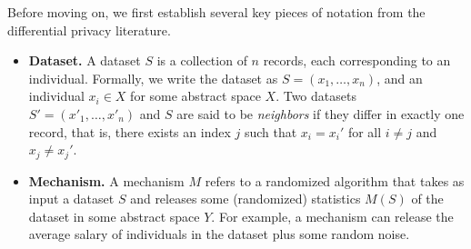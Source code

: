 Before moving on, we first establish several key pieces of notation from the differential privacy literature.
\begin{itemize}
\item  %
{\bf Dataset.} A dataset $S$ is a collection of $n$ records, each corresponding to an individual. Formally, we write the dataset as $S = (x_1,\ldots, x_n)$, and an individual $x_i \in X$ for some abstract space $X$. Two datasets $S' = (x'_1,\ldots, x'_n)$ and $S$ are said to be \textit{neighbors} if they differ in exactly one record, that is, there exists an index $j$ such that $x_i = x_i'$ for all $i \ne j$ and $x_j \ne x_j'$.



\item {\bf Mechanism.}  A mechanism $M$ refers to a randomized algorithm that takes as input a dataset $S$ and releases some (randomized) statistics $M(S)$ of the dataset in some abstract space $Y$. For example, a mechanism can release the average salary of individuals in the dataset plus some random noise.


\end{itemize}

